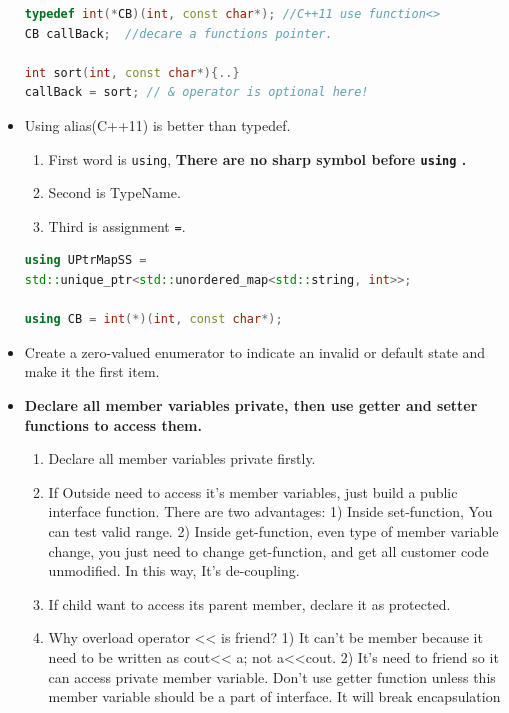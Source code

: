 \documentclass[a4paper,12pt,twoside]{book}
\begin{document}
\begin{itemize}
\begin{lstlisting}[frame=single, language=c++]
typedef int(*CB)(int, const char*); //C++11 use function<>
CB callBack;  //decare a functions pointer.

int sort(int, const char*){..}
callBack = sort; // & operator is optional here!
\end{lstlisting}

\item Using alias(C++11) is better than typedef. 
\begin{enumerate}
\item First word is \texttt{using}, \textbf{There are no sharp symbol before \texttt{using} .} 
\item Second is TypeName. 
\item Third is assignment \texttt{=}.  
\end{enumerate}

\begin{lstlisting}[frame=single, language=c++]
using UPtrMapSS =
std::unique_ptr<std::unordered_map<std::string, int>>;

using CB = int(*)(int, const char*);
\end{lstlisting}

\item Create a zero-valued enumerator to indicate an invalid or default state and make it the first item.

\item \textbf{Declare all member variables private, then use getter and setter functions to access them.}
\begin{enumerate}
    \item Declare all member variables private firstly.
    
    \item If Outside need to access it's member variables, just build a public interface function. There are two advantages: 1) Inside set-function, You can test valid range. 2) Inside get-function, even type of member variable change, you just need to change get-function, and get all customer code unmodified. In this way, It's de-coupling.
     
    \item If child want to access its parent member, declare it as protected.
    
    \item Why overload operator << is friend? 1) It can't be member because it need to be written as cout<< a; not a<<cout. 2) It's need to friend so it can access private member variable. Don't use getter function unless this member variable should be a part of interface. It will break encapsulation 
\end{enumerate}


\end{itemize}
\end{document}
